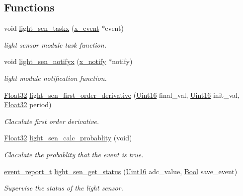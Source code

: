 \subsection*{Functions}
\begin{DoxyCompactItemize}
\item 
void \hyperlink{a00047_ae9aa2f8b8e90a92755efbcd161c67bc0}{light\+\_\+sen\+\_\+taskx} (\hyperlink{a00036_de/d37/a00849}{x\+\_\+event} $\ast$event)
\begin{DoxyCompactList}\small\item\em light sensor module task function. \end{DoxyCompactList}\item 
void \hyperlink{a00047_a317b03892739257278fd51ab8003962d}{light\+\_\+sen\+\_\+notifyx} (\hyperlink{a00036_df/d4c/a00851}{x\+\_\+notify} $\ast$notify)
\begin{DoxyCompactList}\small\item\em light module notification function. \end{DoxyCompactList}\item 
\hyperlink{a00072_a87d38f886e617ced2698fc55afa07637}{Float32} \hyperlink{a00047_a4c8812458e0a70eaa4be14a7ca5dc9b7}{light\+\_\+sen\+\_\+first\+\_\+order\+\_\+derivative} (\hyperlink{a00072_a59a9f6be4562c327cbfb4f7e8e18f08b}{Uint16} final\+\_\+val, \hyperlink{a00072_a59a9f6be4562c327cbfb4f7e8e18f08b}{Uint16} init\+\_\+val, \hyperlink{a00072_a87d38f886e617ced2698fc55afa07637}{Float32} period)
\begin{DoxyCompactList}\small\item\em Claculate first order derivative. \end{DoxyCompactList}\item 
\hyperlink{a00072_a87d38f886e617ced2698fc55afa07637}{Float32} \hyperlink{a00047_acfaee257a4ad46d9d0ffb57f97d8f35f}{light\+\_\+sen\+\_\+calc\+\_\+probablity} (void)
\begin{DoxyCompactList}\small\item\em Claculate the probablity that the event is true. \end{DoxyCompactList}\item 
\hyperlink{a00021_d6/d66/a00441}{event\+\_\+report\+\_\+t} \hyperlink{a00047_a8ae9d26a7404094bcd7cbef5ed40da75}{light\+\_\+sen\+\_\+get\+\_\+status} (\hyperlink{a00072_a59a9f6be4562c327cbfb4f7e8e18f08b}{Uint16} adc\+\_\+value, \hyperlink{a00072_a253b248072cfc8bd812c69acd0046eed}{Bool} save\+\_\+event)
\begin{DoxyCompactList}\small\item\em Supervise the status of the light sensor. \end{DoxyCompactList}\item 

\end{DoxyCompactItemize}
